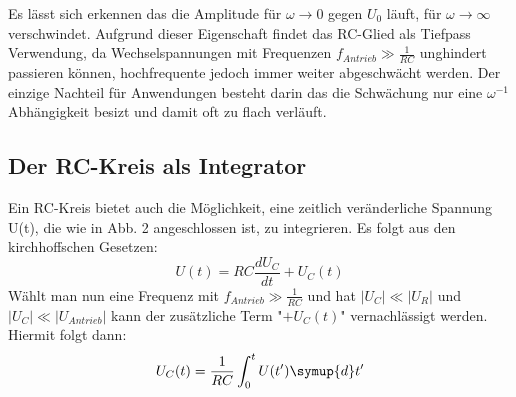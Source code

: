 Es lässt sich erkennen das die Amplitude für $\omega \to 0$ gegen $U_0$ läuft, für
$\omega \to \infty$ verschwindet. Aufgrund dieser Eigenschaft findet das RC-Glied als
 Tiefpass Verwendung, da Wechselspannungen mit Frequenzen $f_{Antrieb} \gg \frac{1}{RC}$
  unghindert passieren können, hochfrequente jedoch immer weiter abgeschwächt werden.
  Der einzige Nachteil für Anwendungen besteht darin das die Schwächung nur eine $\omega^{-1}$
  Abhängigkeit besizt und damit oft zu flach verläuft.

\subsection{Der RC-Kreis als Integrator}

Ein RC-Kreis bietet auch die Möglichkeit, eine zeitlich veränderliche Spannung U(t), die
wie in Abb. 2 angeschlossen ist, zu integrieren. Es folgt aus den kirchhoffschen Gesetzen:
\begin{equation}
  U(t) = RC\frac{dU_C}{dt}+U_C(t)
\end{equation}
Wählt man nun eine Frequenz mit $f_{Antrieb} \gg \frac{1}{RC}$ und hat
$|U_C| \ll |U_R|$ und $|U_C| \ll |U_{Antrieb}|$ kann der zusätzliche Term "$+ U_C(t)$"
 vernachlässigt werden. Hiermit folgt dann:
\begin{equation}
U_C(t) = \frac{1}{RC}\int_{0}^{t} U(t') \symup{d}t'
\end{equation}
